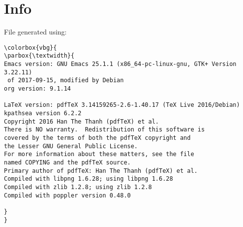 \documentclass[a4paper, 12pt, english]{myreport}
\begin{document}
\section*{Info}
\label{sec:org006d217}
File generated using:
\begin{Verbatim}[commandchars=\\\{\}]
\colorbox{vbg}{
\parbox{\textwidth}{
Emacs version: GNU Emacs 25.1.1 (x86_64-pc-linux-gnu, GTK+ Version 3.22.11)
 of 2017-09-15, modified by Debian
org version: 9.1.14

LaTeX version: pdfTeX 3.14159265-2.6-1.40.17 (TeX Live 2016/Debian)
kpathsea version 6.2.2
Copyright 2016 Han The Thanh (pdfTeX) et al.
There is NO warranty.  Redistribution of this software is
covered by the terms of both the pdfTeX copyright and
the Lesser GNU General Public License.
For more information about these matters, see the file
named COPYING and the pdfTeX source.
Primary author of pdfTeX: Han The Thanh (pdfTeX) et al.
Compiled with libpng 1.6.28; using libpng 1.6.28
Compiled with zlib 1.2.8; using zlib 1.2.8
Compiled with poppler version 0.48.0

}
}
\end{Verbatim}

\newpage
\nocite{*}


\printindex
\printindex[other]
\end{document}
